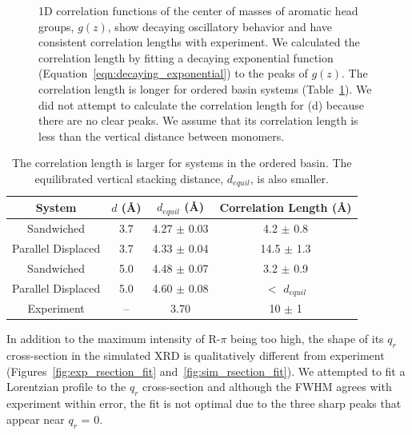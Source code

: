 \documentclass[journal=jpcbfk,manuscript=article]{achemso}
\begin{document}
\begin{figure}[!htb]
  \caption{1D correlation functions of the center of masses of aromatic head
	  groups, $g(z)$, show decaying oscillatory behavior and have consistent correlation lengths with experiment. We calculated the
	  correlation length by fitting a decaying exponential function
	  (Equation~\ref{eqn:decaying_exponential}) to the peaks of $g(z)$. The
	  correlation length is longer for ordered basin systems
	  (Table~\ref{table:correlation_length}). We did not attempt to calculate the
	  correlation length for (d) because there are no clear peaks. We assume that its
	  correlation length is less than the vertical distance between monomers.}\label{fig:correlation}
  \end{figure}  
  
  \begin{table}[h]
  \centering
  \begin{tabular}{cccc}
  \toprule
  System             & $\mathit{d}$ (\AA) & $\mathit{d}_{equil}$ (\AA) & Correlation Length (\AA) \\
  \midrule
  Sandwiched         & 3.7                &    4.27 $\pm$ 0.03         & 4.2 $\pm$ 0.8            \\
  Parallel Displaced & 3.7                &    4.33 $\pm$ 0.04         & 14.5 $\pm$ 1.3           \\ 
  Sandwiched         & 5.0                &    4.48 $\pm$ 0.07         & 3.2 $\pm$ 0.9            \\
  Parallel Displaced & 5.0                &    4.60 $\pm$ 0.08         & $<$ $d_{equil}$ \\ 
  Experiment         & --                 &    3.70                    & 10 $\pm$ 1               \\
  \bottomrule
  \end{tabular}
  \caption{The correlation length is larger for systems in the ordered basin. The equilibrated vertical
  stacking distance, $\mathit{d}_{equil}$, is also smaller.}
  \label{table:correlation_length}
  \end{table}

  In addition to the maximum intensity of R-$\pi$ being too high, the shape
  of its $q_r$ cross-section in the simulated XRD is qualitatively different
  from experiment (Figures~\ref{fig:exp_rsection_fit}
  and~\ref{fig:sim_rsection_fit}). We attempted to fit a Lorentzian profile to 
  the $q_r$ cross-section and although the FWHM agrees with experiment within
  error, the fit is not optimal due to the three sharp peaks that appear near
  $q_r$ = 0. 
  
\end{document}

